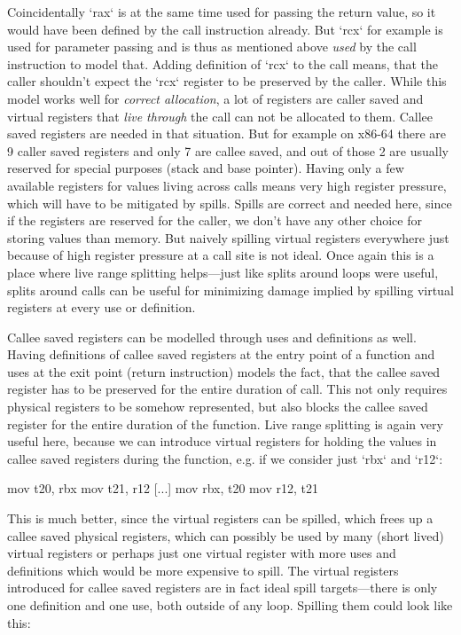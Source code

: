 Coincidentally `rax` is at the same time used for passing the return value, so
it would have been defined by the call instruction already. But `rcx` for
example is used for parameter passing and is thus as mentioned above {\em used}
by the call instruction to model that. Adding definition of `rcx` to the call
means, that the caller shouldn't expect the `rcx` register to be preserved by
the caller. While this model works well for {\em correct allocation}, a lot of
registers are caller saved and virtual registers that {\em live through} the
call can not be allocated to them. Callee saved registers are needed in that
situation. But for example on x86-64 there are 9 caller saved registers and only
7 are callee saved, and out of those 2 are usually reserved for special purposes
(stack and base pointer). Having only a few available registers for values
living across calls means very high register pressure, which will have to be
mitigated by spills. Spills are correct and needed here, since if the registers
are reserved for the caller, we don't have any other choice for storing values
than memory. But naively spilling virtual registers everywhere just because of
high register pressure at a call site is not ideal. Once again this is a place
where live range splitting helps---just like splits around loops were useful,
splits around calls can be useful for minimizing damage implied by spilling
virtual registers at every use or definition.

Callee saved registers can be modelled through uses and definitions as well.
Having definitions of callee saved registers at the entry point of a function
and uses at the exit point (return instruction) models the fact, that the callee
saved register has to be preserved for the entire duration of call. This not
only requires physical registers to be somehow represented, but also blocks the
callee saved register for the entire duration of the function. Live range
splitting is again very useful here, because we can introduce virtual registers
for holding the values in callee saved registers during the function, e.g. if we
consider just `rbx` and `r12`:

\begtt
mov t20, rbx
mov t21, r12
[...]
mov rbx, t20
mov r12, t21
\endtt

This is much better, since the virtual registers can be spilled, which frees up
a callee saved physical registers, which can possibly be used by many (short
lived) virtual registers or perhaps just one virtual register with more uses and
definitions which would be more expensive to spill. The virtual
registers introduced for callee saved registers are in fact ideal spill
targets---there is only one definition and one use, both outside of any loop.
Spilling them could look like this:

